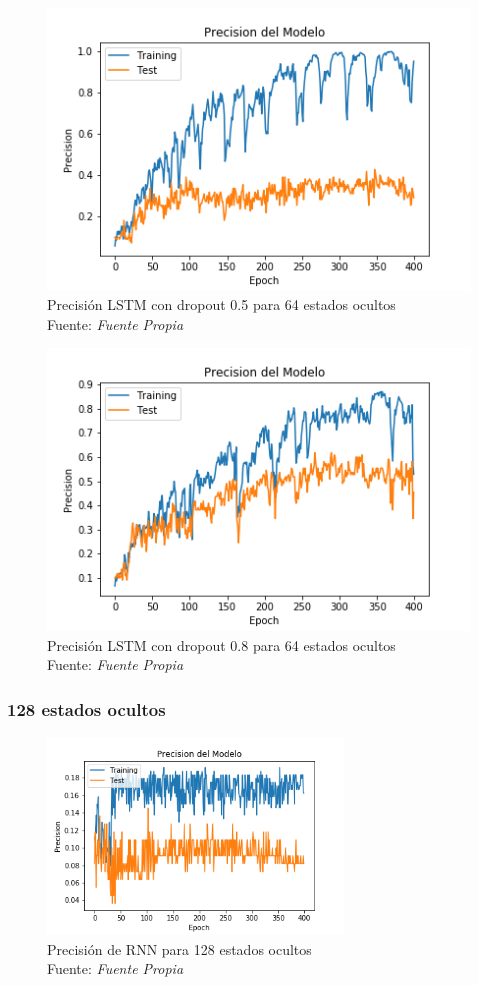 \begin{figure}[H]
	\centering
	\includegraphics[width=0.7\linewidth]{Figures/lstm_64_05_prec}
	\caption{Precisión LSTM con dropout 0.5 para 64 estados ocultos\\ Fuente: {\textit{Fuente Propia}}}
	\label{fig:lstm6405prec}
\end{figure}
\begin{figure}[H]
	\centering
	\includegraphics[width=0.7\linewidth]{Figures/lstm_64_08_prec}
	\caption{Precisión LSTM con dropout 0.8 para 64 estados ocultos\\ Fuente: {\textit{Fuente Propia}}}
	\label{fig:lstm6408prec}
\end{figure}

\subsubsection{128 estados ocultos}\label{128stateprec}
\begin{figure}[H]
\centering
	\includegraphics[width=0.7\textwidth]{Figures/rnn_prec_400_13mfcc}
	\caption{Precisión de RNN para 128 estados ocultos\\ Fuente: {\textit{Fuente Propia}}}
	\label{RNNSIMPLE}
\end{figure} 

